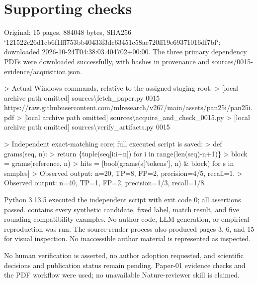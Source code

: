 \documentclass[10pt]{article}
\begin{document}
\section*{Supporting checks}
Original: 15 pages, 884048 bytes, SHA256 `121522c26d1cb6f1fff753bb40433f3dc63451c58ae720ff19e69371016df7bf`; downloaded 2026-10-24T04:38:03.404702+00:00. The three primary dependency PDFs were downloaded successfully, with hashes in provenance and sources/0015-evidence/acquisition.json.\par
> Actual Windows commands, relative to the assigned staging root:
> [local archive path omitted] sources\textbackslash{}fetch\_paper.py 0015 https://raw.githubusercontent.com/mlresearch/v267/main/assets/pan25i/pan25i.pdf
> [local archive path omitted] sources\textbackslash{}acquire\_and\_check\_0015.py
> [local archive path omitted] sources\textbackslash{}verify\_artifacts.py 0015\par
> Independent exact-matching core; full executed script is saved:
> def grams(seq, n):
> return \{tuple(seq[i:i+n]) for i in range(len(seq)-n+1)\}
> block = grams(reference, n)
> hits = [bool(grams(s[’tokens’], n) \& block) for s in samples]
> Observed output: n=20, TP=8, FP=2, precision=4/5, recall=1.
> Observed output: n=40, TP=1, FP=2, precision=1/3, recall=1/8.\par
Python 3.13.5 executed the independent script with exit code 0; all assertions passed. contains every synthetic candidate, fixed label, match result, and five rounding-compatibility examples. No author code, LLM generation, or empirical reproduction was run. The source-render process also produced pages 3, 6, and 15 for visual inspection. No inaccessible author material is represented as inspected.\par
No human verification is asserted, no author adoption requested, and scientific decisions and publication status remain pending. Paper-01 evidence checks and the PDF workflow were used; no unavailable Nature-reviewer skill is claimed.\par
\end{document}
